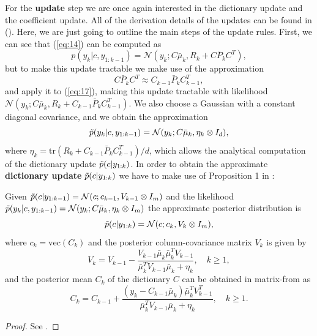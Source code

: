 \documentclass{mldsmsc}
\begin{document}
\noindent For the \textbf{update} step we are once again interested in the dictionary update and the coefficient update. All of the derivation details of the updates can be found in (\cite{akyildiz2021probabilistic}). Here, we are just going to outline the main steps of the update rules. First, we can see that (\ref{eq:14}) can be computed as
\begin{equation} \label{eq:17}
    p(y_k | c, y_{1:k-1}) = \mathcal{N}(y_k; C \bar{\mu}_k, R_k + C \bar{P}_k C^T),
\end{equation}
but to make this update tractable we make use of the approximation
\begin{equation}
    C \bar{P}_k C^T \approx C_{k-1} \bar{P}_k C^T_{k-1},
\end{equation}
and apply it to (\ref{eq:17}), making this update tractable with likelihood $\mathcal{N}(y_k; C \bar{\mu}_k, R_k + C_{k-1} \bar{P}_k C_{k-1}^T)$. We also choose a Gaussian with a constant diagonal covariance, and we obtain the approximation
\begin{equation}\label{eq:18}
    \Tilde{p}(y_k | c, y_{1:k-1}) = \mathcal{N}(y_k; C \bar{\mu}_k, \eta_k \otimes I_d),
\end{equation}
where $\eta_k = \text{tr}(R_k + C_{k-1} \bar{P}_{k} C_{k-1}^{T}) / d $, which allows the analytical computation of the dictionary update $\Tilde{p}(c | y_{1:k})$. In order to obtain the approximate \textbf{dictionary update} $\Tilde{p}(c | y_{1:k})$ we have to make use of Proposition 1 in \cite{akyildiz2021probabilistic}:
\begin{proposition}
    Given $\Tilde{p}(c | y_{1:k-1}) = \mathcal{N}(c; c_{k-1}, V_{k-1} \otimes I_m)$ and the likelihood $\Tilde{p}(y_k | c, y_{1:k-1}) = \mathcal{N}(y_k; C \bar{\mu}_k, \eta_k \otimes I_m)$ the approximate posterior distribution is
    \begin{equation}
        \Tilde{p}(c | y_{1:k}) = \mathcal{N}(c; c_k, V_k \otimes I_m),
    \end{equation}
    where $c_k = \text{vec}(C_k)$ and the posterior column-covariance matrix $V_k$ is given by
    \begin{equation}
        V_k = V_{k-1} - \frac{V_{k-1} \bar{\mu}_k \bar{\mu}^T_k V_{k-1}}{\bar{\mu}_k^T V_{k-1} \bar{\mu}_k + \eta_k}, \quad k \geq 1,
    \end{equation}
    and the posterior mean $C_k$ of the dictionary $C$ can be obtained in matrix-from as
    \begin{equation}
        C_k = C_{k-1} + \frac{(y_k - C_{k-1}\bar{\mu}_k)\bar{\mu}_k^T V_{k-1}^T}{\bar{\mu}_k^T V_{k-1} \bar{\mu}_k + \eta_k}, \quad k \geq 1.
    \end{equation}
\end{proposition}
\begin{proof}
    See \cite{akyildiz2021probabilistic}.
\end{proof}\newline
\end{document}
